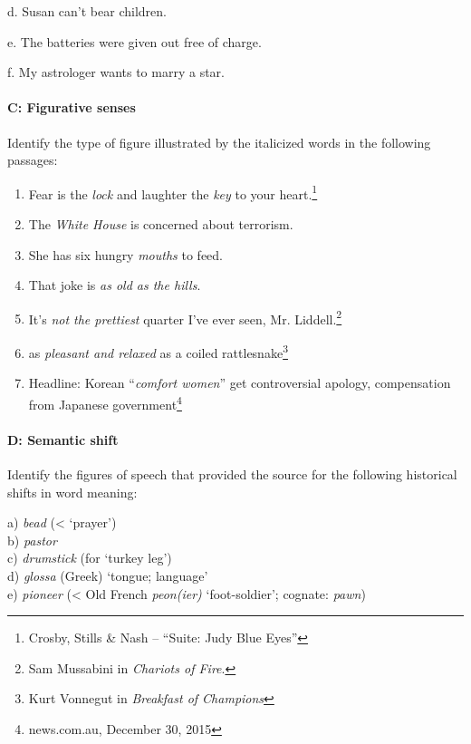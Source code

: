 \begin{stylepoints}
  d. Susan can’t bear children.
\end{stylepoints}

\begin{stylepoints}
  e. The batteries were given out free of charge.
\end{stylepoints}

\begin{stylepoints}
  f. My astrologer wants to marry a star.
\end{stylepoints}

\paragraph{C: Figurative senses}

Identify the type of figure illustrated by the italicized words in the following passages:

\begin{enumerate}
\item Fear is the \textit{lock} and laughter the \textit{key} to your heart.\footnote{Crosby, Stills \& Nash – “Suite: Judy Blue Eyes”}
\item The \textit{White House} is concerned about terrorism.
\item She has six hungry \textit{mouths} to feed.
\item That joke is \textit{as old as the hills}.
\item It’s \textit{not the prettiest} quarter I’ve ever seen, Mr. Liddell.\footnote{Sam Mussabini in \textit{Chariots of Fire}.}
\item as \textit{pleasant and relaxed} as a coiled rattlesnake\footnote{Kurt Vonnegut in \textit{Breakfast of Champions}}
\item Headline: Korean “\textit{comfort women}” get controversial apology, compensation from Japanese government\footnote{news.com.au, December 30, 2015}
\end{enumerate}
\paragraph{D: Semantic shift}

Identify the figures of speech that provided the source for the following historical shifts in word meaning:

\begin{stylepoints}
a) \textit{bead} (< ‘prayer’)\\
b) \textit{pastor}\\
c) \textit{drumstick} (for ‘turkey leg’)\\
d) \textit{glossa} (Greek) ‘tongue; language’\\
e) \textit{pioneer} (< Old French \textit{peon(ier)} ‘foot-soldier’; cognate: \textit{pawn})
\end{stylepoints}

